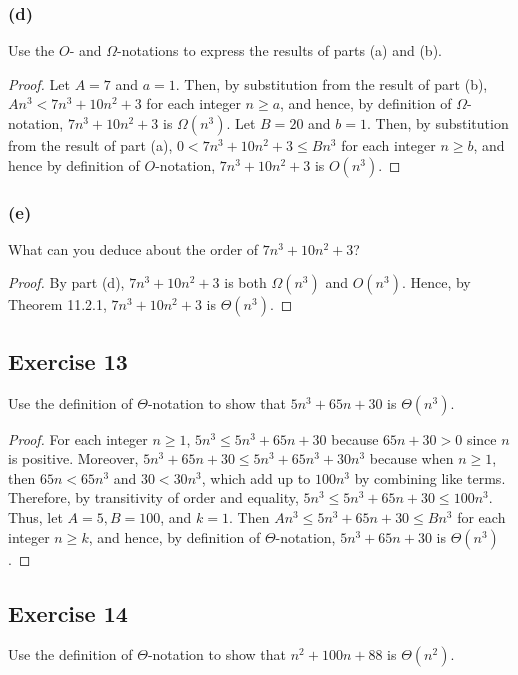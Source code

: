\documentclass[14pt]{extarticle}
\begin{document}
\subsubsection{(d)}
Use the \(O\)- and \(\Omega\)-notations to express the results of parts (a) and (b).

\begin{proof}
Let \(A = 7\) and \(a = 1\). Then, by substitution from the result of part (b), \(An^3 < 7n^3 + 10n^2 + 3\) for each 
integer \(n \geq a\), and hence, by definition of \(\Omega\)-notation, \(7n^3 + 10n^2 + 3\) is \(\Omega(n^3)\). Let 
\(B = 20\) and \(b = 1\). Then, by substitution from the result of part (a), \(0 < 7n^3 + 10n^2 + 3 \leq Bn^3\) for 
each integer \(n \geq b\), and hence by definition of \(O\)-notation, \(7n^3 + 10n^2 + 3\) is \(O(n^3)\).
\end{proof}

\subsubsection{(e)}
What can you deduce about the order of \(7n^3 + 10n^2 + 3\)?
\begin{proof}
By part (d), \(7n^3 + 10n^2 + 3\) is both \(\Omega(n^3)\) and \(O(n^3)\). Hence, by Theorem 11.2.1, \(7n^3 + 10n^2 + 3\) is 
\(\Theta(n^3)\).
\end{proof}

\subsection{Exercise 13}
Use the definition of \(\Theta\)-notation to show that \(5n^3 + 65n + 30\) is \(\Theta(n^3)\).

\begin{proof}
For each integer \(n \geq 1\), \(5n^3 \leq 5n^3 + 65n + 30\) because \(65n + 30 > 0\) since \(n\) is positive. Moreover, 
\(5n^3 + 65n + 30 \leq 5n^3 + 65n^3 + 30n^3\) because when \(n \geq 1\), then \(65n < 65n^3\) and \(30 < 30n^3\), which add 
up to \(100n^3\) by combining like terms. Therefore, by transitivity of order and equality, \(5n^3 \leq 5n^3 + 65n + 
30 \leq 100n^3\). Thus, let \(A = 5, B = 100\), and \(k = 1\). Then \(An^3 \leq 5n^3 + 65n + 30 \leq Bn^3\) for each integer 
\(n \geq k\), and hence, by definition of \(\Theta\)-notation, \(5n^3 + 65n + 30\) is \(\Theta(n^3)\).
\end{proof}

\subsection{Exercise 14}
Use the definition of \(\Theta\)-notation to show that \(n^2 + 100n + 88\) is \(\Theta(n^2)\).
\end{document}
